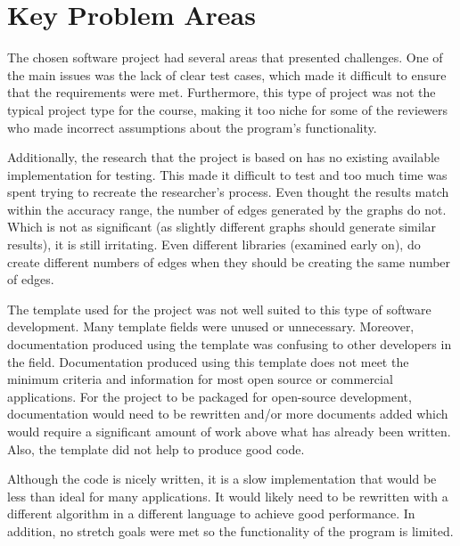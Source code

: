 \documentclass{article}
\begin{document}

\section{Key Problem Areas}

The chosen software project had several areas that presented challenges.
One of the main issues was the lack of clear test cases, which made it difficult to ensure that the requirements were met. 
Furthermore, this type of project was not the typical project type for the course, making it too niche for some of the reviewers who made incorrect assumptions about the program's functionality.

Additionally, the research \cite{zighed_statistical_2005} that the project is based on has no existing available implementation for testing.
This made it difficult to test and too much time was spent trying to recreate the researcher's process.
Even thought the results match within the accuracy range, the number of edges generated by the graphs do not.
Which is not as significant (as slightly different graphs should generate similar results), it is still irritating.
Even different libraries (examined early on), do create different numbers of edges when they should be creating the same number of edges.


The template used for the project was not well suited to this type of software development.
Many template fields were unused or unnecessary.
Moreover, documentation produced using the template was confusing to other developers in the field. 
Documentation produced using this template does not meet the minimum criteria and information for most open source or commercial applications.
For the project to be packaged for open-source development, documentation would need to be rewritten and/or more documents added which would require a significant amount of work above what has already been written.
Also, the template did not help to produce good code.

Although the code is nicely written, it is a slow implementation that would be less than ideal for many applications.
It would likely need to be rewritten with a different algorithm in a different language to achieve good performance.
In addition, no stretch goals were met so the functionality of the program is limited.


\end{document}
